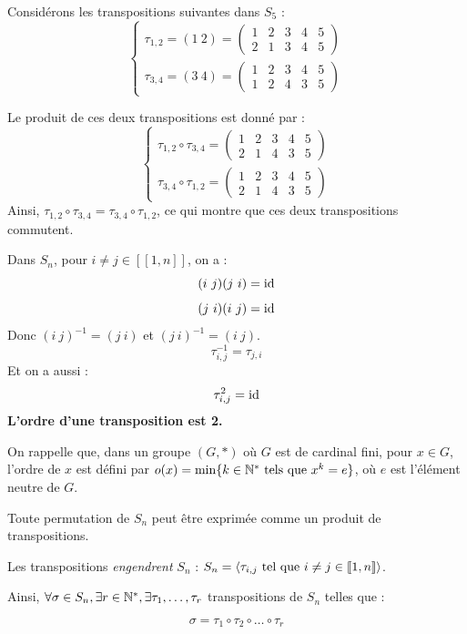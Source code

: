 \documentclass[12pt, a4paper]{report}
\begin{document}
\begin{example}
    Considérons les transpositions suivantes dans $S_5$ :
    \[\begin{cases}
    \tau_{1,2} = (1 \ 2) = \left(\begin{matrix} 1 & 2 & 3 & 4 & 5 \\ 2 & 1 & 3 & 4 & 5 \end{matrix}\right)
    \\
    \tau_{3,4} = (3 \ 4) = \left(\begin{matrix} 1 & 2 & 3 & 4 & 5 \\ 1 & 2 & 4 & 3 & 5 \end{matrix}\right)
    \end{cases}
    \]
    
    Le produit de ces deux transpositions est donné par :
    \[\begin{cases}
\tau_{1,2} \circ \tau_{3,4} = \left(\begin{matrix} 1 & 2 & 3 & 4 & 5 \\ 2 & 1 & 4 & 3 & 5 \end{matrix}\right)
\\
\tau_{3,4} \circ \tau_{1,2} = \left(\begin{matrix} 1 & 2 & 3 & 4 & 5 \\ 2 & 1 & 4 & 3 & 5 \end{matrix}\right)
    \end{cases}
    \]
    Ainsi, $\tau_{1,2} \circ \tau_{3,4} = \tau_{3,4} \circ \tau_{1,2}$, ce qui montre que ces deux transpositions commutent.
\end{example}

\begin{remark}
    Dans $S_n$, pour $i \ne j \in [\![1,n]\!]$, on a :
    $$(i \ j)(j \ i) = \mathrm{id}$$
    $$(j \ i)(i \ j) = \mathrm{id}$$
    Donc $(i \ j)^{-1} = (j \ i)$ et $(j \ i)^{-1} = (i \ j)$.
    $$\tau_{i,j}^{-1} = \tau_{j,i}$$
    Et on a aussi :
    $$\tau_{i,j}^2 = \mathrm{id}$$
    \textbf{L'ordre d'une transposition est 2.}
\end{remark}

On rappelle que, dans un groupe $(G,*)$ où $G$ est de cardinal fini, pour $x \in G$, l'ordre de $x$ est défini par $o(x) = \min\{k \in \mathbb{N}^* \text{ tels que } x^k = e\}$, où $e$ est l'élément neutre de $G$.

\begin{property}
    Toute permutation de $S_n$ peut être exprimée comme un produit de transpositions.

    Les transpositions \textit{engendrent} $S_n$ : $S_n = \langle \tau_{i,j} \text{ tel que } i \ne j \in [\![1,n]\!] \rangle$.

    Ainsi, $\forall \sigma \in S_n, \exists r \in \mathbb{N}^*, \exists \tau_1, \dots, \tau_r$ transpositions de $S_n$ telles que :

    $$\sigma = \tau_1 \circ \tau_2 \circ \dots \circ \tau_r$$ 
\end{property}
\end{document}

